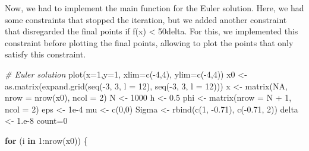 \documentclass[
]{article}
\newenvironment{Shaded}{\begin{snugshade}}{\end{snugshade}}
\newcommand{\AttributeTok}[1]{\textcolor[rgb]{0.77,0.63,0.00}{#1}}
\newcommand{\CommentTok}[1]{\textcolor[rgb]{0.56,0.35,0.01}{\textit{#1}}}
\newcommand{\ConstantTok}[1]{\textcolor[rgb]{0.00,0.00,0.00}{#1}}
\newcommand{\ControlFlowTok}[1]{\textcolor[rgb]{0.13,0.29,0.53}{\textbf{#1}}}
\newcommand{\DecValTok}[1]{\textcolor[rgb]{0.00,0.00,0.81}{#1}}
\newcommand{\FloatTok}[1]{\textcolor[rgb]{0.00,0.00,0.81}{#1}}
\newcommand{\FunctionTok}[1]{\textcolor[rgb]{0.00,0.00,0.00}{#1}}
\newcommand{\NormalTok}[1]{#1}
\newcommand{\OtherTok}[1]{\textcolor[rgb]{0.56,0.35,0.01}{#1}}
\newcommand{\SpecialCharTok}[1]{\textcolor[rgb]{0.00,0.00,0.00}{#1}}
\begin{document}
Now, we had to implement the main function for the Euler solution. Here,
we had some constraints that stopped the iteration, but we added another
constraint that disregarded the final points if f(x) \textless{}
50delta. For this, we implemented this constraint before plotting the
final points, allowing to plot the points that only satisfy this
constraint.

\begin{Shaded}
\begin{Highlighting}[]
\CommentTok{\# Euler solution}
\FunctionTok{plot}\NormalTok{(}\AttributeTok{x=}\DecValTok{1}\NormalTok{,}\AttributeTok{y=}\DecValTok{1}\NormalTok{, }\AttributeTok{xlim=}\FunctionTok{c}\NormalTok{(}\SpecialCharTok{{-}}\DecValTok{4}\NormalTok{,}\DecValTok{4}\NormalTok{), }\AttributeTok{ylim=}\FunctionTok{c}\NormalTok{(}\SpecialCharTok{{-}}\DecValTok{4}\NormalTok{,}\DecValTok{4}\NormalTok{))}
\NormalTok{x0 }\OtherTok{\textless{}{-}} \FunctionTok{as.matrix}\NormalTok{(}\FunctionTok{expand.grid}\NormalTok{(}\FunctionTok{seq}\NormalTok{(}\SpecialCharTok{{-}}\DecValTok{3}\NormalTok{, }\DecValTok{3}\NormalTok{, }\AttributeTok{l =} \DecValTok{12}\NormalTok{), }\FunctionTok{seq}\NormalTok{(}\SpecialCharTok{{-}}\DecValTok{3}\NormalTok{, }\DecValTok{3}\NormalTok{, }\AttributeTok{l =} \DecValTok{12}\NormalTok{)))}
\NormalTok{x }\OtherTok{\textless{}{-}} \FunctionTok{matrix}\NormalTok{(}\ConstantTok{NA}\NormalTok{, }\AttributeTok{nrow =} \FunctionTok{nrow}\NormalTok{(x0), }\AttributeTok{ncol =} \DecValTok{2}\NormalTok{)}
\NormalTok{N }\OtherTok{\textless{}{-}} \DecValTok{1000}
\NormalTok{h }\OtherTok{\textless{}{-}} \FloatTok{0.5}
\NormalTok{phi }\OtherTok{\textless{}{-}} \FunctionTok{matrix}\NormalTok{(}\AttributeTok{nrow =}\NormalTok{ N }\SpecialCharTok{+} \DecValTok{1}\NormalTok{, }\AttributeTok{ncol =} \DecValTok{2}\NormalTok{)}
\NormalTok{eps }\OtherTok{\textless{}{-}} \FloatTok{1e{-}4}
\NormalTok{mu }\OtherTok{\textless{}{-}} \FunctionTok{c}\NormalTok{(}\DecValTok{0}\NormalTok{,}\DecValTok{0}\NormalTok{)}
\NormalTok{Sigma }\OtherTok{\textless{}{-}} \FunctionTok{rbind}\NormalTok{(}\FunctionTok{c}\NormalTok{(}\DecValTok{1}\NormalTok{, }\SpecialCharTok{{-}}\FloatTok{0.71}\NormalTok{), }\FunctionTok{c}\NormalTok{(}\SpecialCharTok{{-}}\FloatTok{0.71}\NormalTok{, }\DecValTok{2}\NormalTok{))}
\NormalTok{delta }\OtherTok{\textless{}{-}} \DecValTok{1}\NormalTok{.e}\DecValTok{{-}8}
\NormalTok{count}\OtherTok{=}\DecValTok{0}

\ControlFlowTok{for}\NormalTok{ (i }\ControlFlowTok{in} \DecValTok{1}\SpecialCharTok{:}\FunctionTok{nrow}\NormalTok{(x0)) \{}
  

\end{Highlighting}
\end{Shaded}
\end{document}
